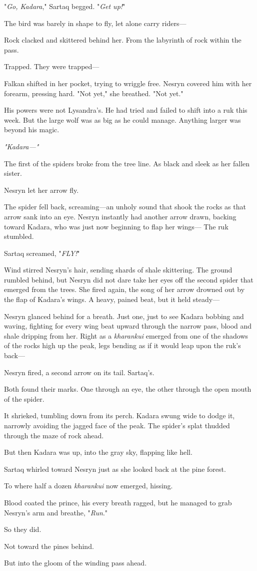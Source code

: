 "\emph{Go, Kadara}," Sartaq begged.
"\emph{Get up!}"

The bird was barely in shape to fly, let alone carry riders---

Rock clacked and skittered behind her.
From the labyrinth of rock within the pass.

Trapped.
They were trapped---

Falkan shifted in her pocket, trying to wriggle free.
Nesryn covered him with her forearm, pressing hard.
"Not yet," she breathed.
"Not yet."

His powers were not Lysandra's.
He had tried and failed to shift into a ruk this week.
But the large wolf was as big as he could manage.
Anything larger was beyond his magic.

\emph{"Kadara---"}

The first of the spiders broke from the tree line.
As black and sleek as her fallen sister.

Nesryn let her arrow fly.

The spider fell back, screaming---an unholy sound that shook the rocks as that arrow sank into an eye.
Nesryn instantly had another arrow drawn, backing toward Kadara, who was just now beginning to flap her wings--- The ruk stumbled.

Sartaq screamed, "\emph{FLY!}"

Wind stirred Nesryn's hair, sending shards of shale skittering.
The ground rumbled behind, but Nesryn did not dare take her eyes off the second spider that emerged from the trees.
She fired again, the song of her arrow drowned out by the flap of Kadara's wings.
A heavy, pained beat, but it held steady---

Nesryn glanced behind for a breath.
Just one, just to see Kadara bobbing and waving, fighting for every wing beat upward through the narrow pass, blood and shale dripping from her.
Right as a \emph{kharankui} emerged from one of the shadows of the rocks high up the peak, legs bending as if it would leap upon the ruk's back---

Nesryn fired, a second arrow on its tail.
Sartaq's.

Both found their marks.
One through an eye, the other through the open mouth of the spider.

It shrieked, tumbling down from its perch.
Kadara swung wide to dodge it, narrowly avoiding the jagged face of the peak.
The spider's splat thudded through the maze of rock ahead.

But then Kadara was up, into the gray sky, flapping like hell.

Sartaq whirled toward Nesryn just as she looked back at the pine forest.

To where half a dozen \emph{kharankui} now emerged, hissing.

Blood coated the prince, his every breath ragged, but he managed to grab Nesryn's arm and breathe, "\emph{Run}."

So they did.

Not toward the pines behind.

But into the gloom of the winding pass ahead.

